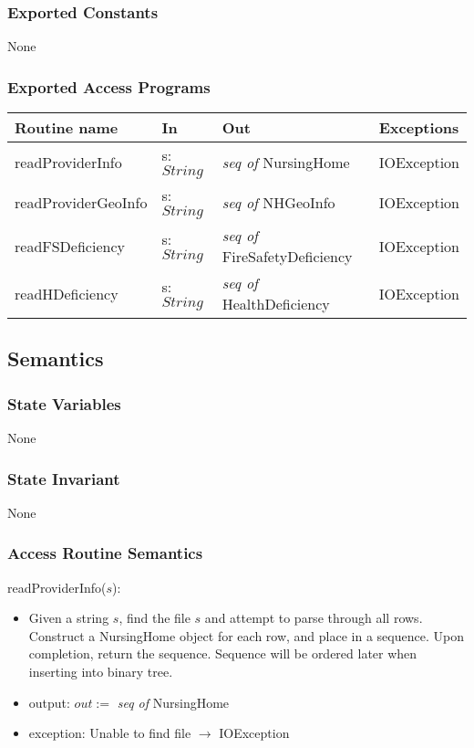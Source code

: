 \documentclass[12pt]{article}
\begin{document}
\subsubsection* {Exported Constants}

None

\subsubsection* {Exported Access Programs}

\begin{tabular}{| l | l | l | p{5cm} |}
\hline
\textbf{Routine name} & \textbf{In} & \textbf{Out} & \textbf{Exceptions}\\
\hline
readProviderInfo & s: $String$ & \textit{seq of} NursingHome & IOException\\
\hline
readProviderGeoInfo & s: $String$ & \textit{seq of} NHGeoInfo & IOException\\
\hline
readFSDeficiency & s: $String$ & \textit{seq of} FireSafetyDeficiency & IOException\\
\hline
readHDeficiency & s: $String$ & \textit{seq of} HealthDeficiency & IOException\\
\hline
\end{tabular}

\subsection* {Semantics}

\subsubsection* {State Variables}

None

\subsubsection* {State Invariant}

None

\subsubsection* {Access Routine Semantics}

\noindent readProviderInfo($s$):
\begin{itemize}
\item Given a string $s$, find the file $s$ and attempt to parse through all rows. Construct a NursingHome object for each row, and place in a sequence. Upon completion, return the sequence. Sequence will be ordered later when inserting into binary tree.
\item output: $out :=$ \textit{seq of} NursingHome
\item exception: Unable to find file $\rightarrow$ IOException
\end{itemize}
\end{document}
